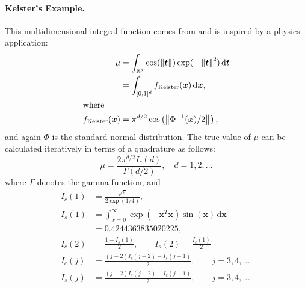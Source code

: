 \documentclass[twocolumn]{svjour3}          %
\newcommand{\bm}[1]{\boldsymbol{#1}}
\newcommand{\dif}[1]{\text{d}{#1}}
\newcommand{\reals}{\mathbb{R}}
\newcommand{\vt}{\bm{t}}
\newcommand{\vx}{\bm{x}}
\newcommand{\dvx}{\dif{\bm{x}}}
\newcommand{\dvt}{\dif{\bm{t}}}
\newcommand{\norm}[2][{}]{\ensuremath{\left \lVert #2 \right \rVert}_{#1}}
\begin{document}
\paragraph{Keister's Example.}

This multidimensional integral function comes from \cite{Kei96} and is inspired by a physics application:
\begin{align*}
\mu & =  \int_{\reals^d} \cos(\norm{ \vt}) \exp(-\norm{ \vt }^2) \, \dvt \\
\nonumber
& = \int_{[0,1]^d} f_{\textup{Keister}}(\vx) \, \dvx,\\
\intertext{where }
f_\textup{Keister}(\vx) &= \pi^{d/2} \cos\left(\norm{ \Phi^{-1}(\vx)/2}\right)  ,
\end{align*}
and again $\Phi$ is the standard normal distribution.
The true value of $\mu$ can be calculated iteratively in terms of a quadrature as follows:  
\begin{equation*}
\mu = \frac{2 \pi^{d/2} I_c(d)}{\Gamma(d/2)}, \quad d=1,2, \ldots
\end{equation*}
where $\Gamma$ denotes the gamma function, and
\begin{align*}
I_c(1) &= \frac{\sqrt{\pi}}{2 \exp(1/4)}, 
\\
I_s(1) &= \int_{x=0}^\infty \exp(-\vx^T\vx)\sin(\vx) \, \dvx 
\\
& =  0.4244363835020225,
\\
I_c(2) &= \frac{1-I_s(1)}{2}, \qquad
I_s(2) = \frac{I_c(1)}{2}
\\
I_c(j) &= \frac{(j-2)I_c(j-2)-I_s(j-1)}{2},
\qquad j =3,4,\ldots
\\
I_s(j) &= \frac{(j-2)I_s(j-2)-I_c(j-1)}{2},
\qquad j =3,4,\ldots.
\end{align*}
\end{document}
